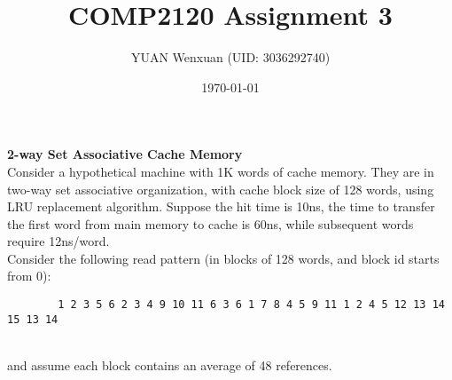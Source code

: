 \documentclass[answers]{exam}
\title{COMP2120 Assignment 3}
\author{YUAN Wenxuan (UID: 3036292740)}
\date{\today}
\begin{document}
\maketitle

\begin{questions}
    \question \textbf{2-way Set Associative Cache Memory} \\
    Consider a hypothetical machine with 1K words of cache memory. They are in two-way set associative organization, with cache block size of 128 words, using LRU replacement algorithm.
    Suppose the hit time is 10ns, the time to transfer the first word from main memory to cache is 60ns, while subsequent words require 12ns/word. \\
    Consider the following read pattern (in blocks of 128 words, and block id starts from 0):
    \begin{listing}[htb]
        \centering
        \begin{verbatim}
        1 2 3 5 6 2 3 4 9 10 11 6 3 6 1 7 8 4 5 9 11 1 2 4 5 12 13 14 15 13 14
        \end{verbatim}
    \end{listing} \\
    and assume each block contains an average of 48 references.

\end{questions}
\end{document}
